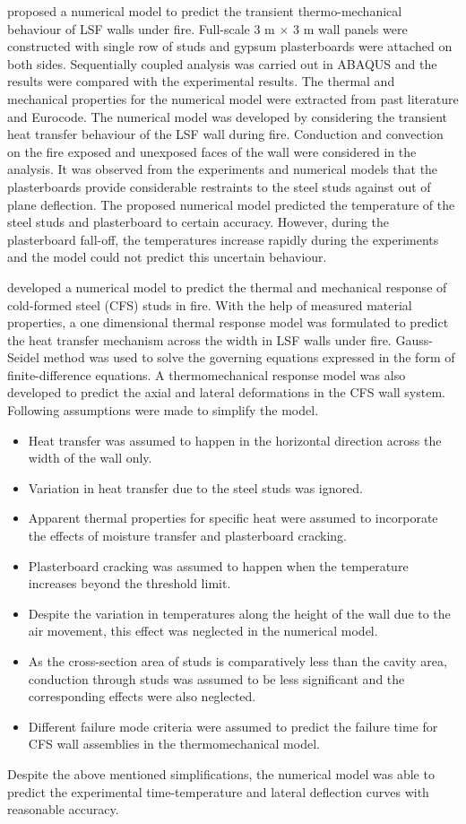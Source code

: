 \citet{Nassif2014a} proposed a numerical model to predict the transient thermo-mechanical behaviour of LSF walls under fire. Full-scale 3 m $\times$ 3 m wall panels were constructed with single row of studs and gypsum plasterboards were attached on both sides. Sequentially coupled analysis was carried out in ABAQUS and the results were compared with the experimental results. The thermal and mechanical properties for the numerical model were extracted from past literature and Eurocode. The numerical model was developed by considering the transient heat transfer behaviour of the LSF wall during fire. Conduction and convection on the fire exposed and unexposed faces of the wall were considered in the analysis. It was observed from the experiments and numerical models that the plasterboards provide considerable restraints to the steel studs against out of plane deflection. The proposed numerical model predicted the temperature of the steel studs and plasterboard to certain accuracy. However, during the plasterboard fall-off, the temperatures increase rapidly during the experiments and the model could not predict this uncertain behaviour. 

\citet{Chen2014} developed a numerical model to predict the thermal and mechanical response of cold-formed steel (CFS) studs in fire. With the help of measured material properties, a one dimensional thermal response model was formulated to predict the heat transfer mechanism across the width in LSF walls under fire. Gauss-Seidel method was used to solve the governing equations expressed in the form of finite-difference equations. A thermomechanical response model was also developed to predict the axial and lateral deformations in the CFS wall system. Following assumptions were made to simplify the model.
\begin{itemize}
	\item Heat transfer was assumed to happen in the horizontal direction across the width of the wall only. 
	\item Variation in heat transfer due to the steel studs was ignored.
	\item Apparent thermal properties for specific heat were assumed to incorporate the effects of moisture transfer and plasterboard cracking.
	\item Plasterboard cracking was assumed to happen when the temperature increases beyond the threshold limit.
	\item Despite the variation in temperatures along the height of the wall due to the air movement, this effect was neglected in the numerical model.
	\item As the cross-section area of studs is comparatively less than the cavity area, conduction through studs was assumed to be less significant and the corresponding effects were also neglected.
	\item Different failure mode criteria were assumed to predict the failure time for CFS wall assemblies in the thermomechanical model.    
\end{itemize}
Despite the above mentioned simplifications, the numerical model was able to predict the experimental time-temperature and lateral deflection curves with reasonable accuracy. 

